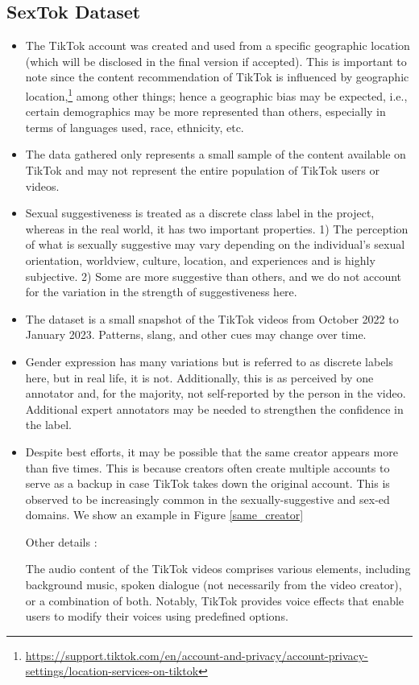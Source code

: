 \documentclass[11pt]{article}
\begin{document}
\subsection*{SexTok Dataset}
\begin{itemize}
\item The TikTok account was created and used from a specific geographic location (which will be disclosed in the final version if accepted). This is important to note since the content recommendation of TikTok is influenced by geographic location,\footnote{\url{https://support.tiktok.com/en/account-and-privacy/account-privacy-settings/location-services-on-tiktok}} among other things; hence a geographic bias may be expected, i.e., certain demographics may be more represented than others, especially in terms of languages used, race, ethnicity, etc.
\item The data gathered only represents a small sample of the content available on TikTok and may not represent the entire population of TikTok users or videos.
\item Sexual suggestiveness is treated as a discrete class label in the project, whereas in the real world, it has two important properties. 1) The perception  of what is sexually suggestive may vary depending on the individual's sexual orientation, worldview, culture, location, and experiences and is highly subjective. 2) Some are more suggestive than others, and we do not account for the variation in the strength of suggestiveness here.  
\item The dataset is a small snapshot of the TikTok videos from October 2022 to January 2023. Patterns, slang, and other cues may change over time.
\item Gender expression has many variations but is referred to as discrete labels here, but in real life, it is not. Additionally, this is as perceived by one annotator and, for the majority, not self-reported by the person in the video. Additional expert annotators may be needed to strengthen the confidence in the label.  
\item Despite best efforts, it may be possible that the same creator appears more than five times. This is because creators often create multiple accounts to serve as a backup in case TikTok takes down the original account. This is observed to be increasingly common in the sexually-suggestive and sex-ed domains. We show an example in Figure \ref{same_creator}

Other details : 

The audio content of the TikTok videos comprises various elements, including background music, spoken dialogue (not necessarily from the video creator), or a combination of both. Notably, TikTok provides voice effects that enable users to modify their voices using predefined options.


\end{itemize}
\end{document}
